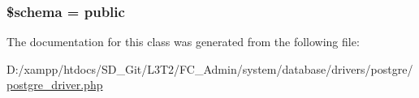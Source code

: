 \subsubsection[{\$schema}]{\setlength{\rightskip}{0pt plus 5cm}\$schema = \textquotesingle{}public\textquotesingle{}}\label{class_c_i___d_b__postgre__driver_a83022b1d70799d2bde3d64dca9cb40ee}


The documentation for this class was generated from the following file\+:\begin{DoxyCompactItemize}
\item 
D\+:/xampp/htdocs/\+S\+D\+\_\+\+Git/\+L3\+T2/\+F\+C\+\_\+\+Admin/system/database/drivers/postgre/\hyperlink{postgre__driver_8php}{postgre\+\_\+driver.\+php}\end{DoxyCompactItemize}
